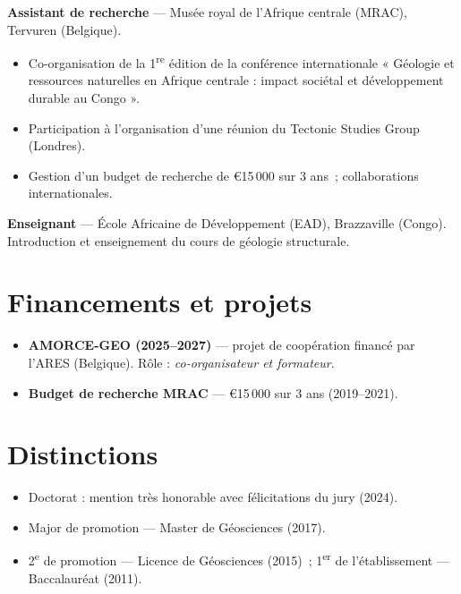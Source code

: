 \documentclass[11pt,a4paper]{article}
\newcommand{\dateb}[1]{{\small\itshape\color{grey}#1}}
\newcommand{\cvrow}[2]{%
  \noindent\makebox[2.7cm][l]{\dateb{#1}}%
  \parbox[t]{\dimexpr\linewidth-2.7cm\relax}{#2}\par\smallskip}
\begin{document}
\cvrow{2019 – 2021}{\textbf{Assistant de recherche} — Musée royal de l'Afrique centrale (MRAC), Tervuren (Belgique).
\begin{itemize}
\item Co-organisation de la 1\textsuperscript{re} édition de la conférence internationale « Géologie et ressources naturelles en Afrique centrale : impact sociétal et développement durable au Congo ».
\item Participation à l'organisation d'une réunion du Tectonic Studies Group (Londres).
\item Gestion d'un budget de recherche de \euro{}15\,000 sur 3 ans~; collaborations internationales.
\end{itemize}}
\cvrow{2019 – 2021}{\textbf{Enseignant} — École Africaine de Développement (EAD), Brazzaville (Congo). Introduction et enseignement du cours de géologie structurale.}

\section{Financements et projets}
\begin{itemize}
\item \textbf{AMORCE-GEO (2025–2027)} — projet de coopération financé par l'ARES (Belgique). Rôle : \emph{co-organisateur et formateur}.
\item \textbf{Budget de recherche MRAC} — \euro{}15\,000 sur 3 ans (2019–2021).
\end{itemize}

\section{Distinctions}
\begin{itemize}
\item Doctorat : mention très honorable avec félicitations du jury (2024).
\item Major de promotion — Master de Géosciences (2017).
\item 2\textsuperscript{e} de promotion — Licence de Géosciences (2015)~; 1\textsuperscript{er} de l'établissement — Baccalauréat (2011).
\end{itemize}
\end{document}
